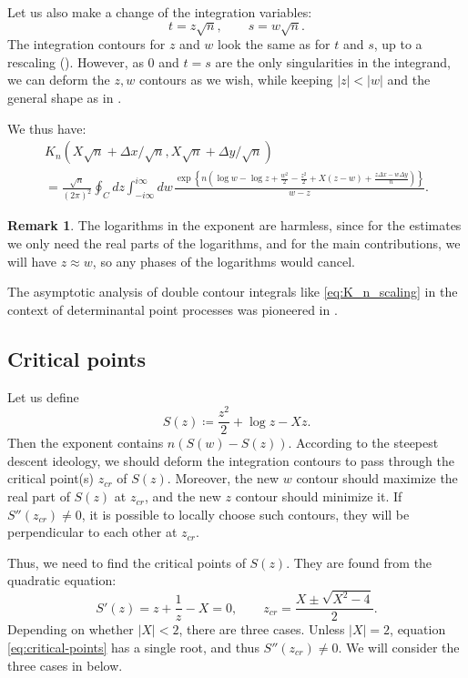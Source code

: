 \documentclass[letterpaper,11pt,oneside,reqno]{article}
\numberwithin{equation}{section}
\newcommand{\ssp}{\hspace{1pt}}
\theoremstyle{definition}
\newtheorem{remark}[proposition]{Remark}
\begin{document}
Let us also make a change of the integration variables:
\begin{equation*}
	t=z\sqrt n,\qquad s=w\sqrt n.
\end{equation*}
The integration contours for $z$ and $w$ look the same as for $t$ and $s$, up to a rescaling
(). However, as $0$
and $t=s$
are the only singularities in the integrand, we can deform the $z,w$
contours as we wish, while keeping $|z|<|w|$
and the general shape as in .

We thus have:
\begin{multline}
	\label{eq:K_n_scaling}
	K_n(X\sqrt n+\Delta x/\sqrt n,X\sqrt n+\Delta y/\sqrt n)\\=
	\frac{\sqrt n}{(2\pi)^2}
	\oint_C dz\int_{-i\infty}^{i\infty}dw\ssp
	\frac{\exp
		\left\{
			n\left(
				\log w -\log z
				+\frac{w^2}{2}-\frac{z^2}{2}
				+X(z-w)+\frac{z \Delta x-w \Delta y}{n}
			\right)
		\right\}
	}{w-z}.
\end{multline}
\begin{remark}
	\label{rmk:log-harmless}
	The logarithms in the exponent are harmless, since for the
	estimates we only need the real parts of the logarithms,
	and for the main contributions, we will have $z\approx w$, so
	any phases of the logarithms would cancel.
\end{remark}

The asymptotic analysis of double contour integrals like
\eqref{eq:K_n_scaling} in the context of determinantal point processes
was pioneered in \cite[Section~3]{Okounkov2002}.

\subsection{Critical points}
\label{sub:critical-points}

Let us define
\begin{equation*}
	S(z)\coloneqq
	\frac{z^2}{2}+\log z -X z.
\end{equation*}
Then the exponent contains $n \left( S(w)-S(z) \right)$.
According to the steepest descent ideology, we
should deform the integration contours
to pass through the critical point(s) $z_{cr}$ of $S(z)$.
Moreover, the new $w$ contour should maximize the real part of $S(z)$
at $z_{cr}$, and the new $z$ contour should minimize it.
If $S''(z_{cr})\ne 0$, it is possible to locally choose such contours,
they will be perpendicular to each other at $z_{cr}$.

Thus, we need to find the critical points of $S(z)$.
They are found from the quadratic equation:
\begin{equation}
	\label{eq:critical-points}
	S'(z)=z+\frac{1}{z}-X=0,\qquad
	z_{cr}=\frac{X\pm \sqrt{X^2-4}}{2}.
\end{equation}
Depending on whether $|X|<2$, there are three cases.
Unless $|X|=2$, equation \eqref{eq:critical-points} has a single root, and
thus $S''(z_{cr})\ne 0$.
We will consider the three cases in
below.
\end{document}
